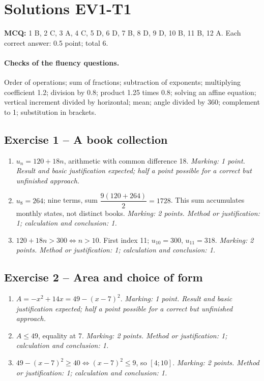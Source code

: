 \clearpage\section*{Solutions EV1-T1}\label{EV1-T1-CORR}
\textbf{MCQ:} 1 B, 2 C, 3 A, 4 C, 5 D, 6 D, 7 B, 8 D, 9 D, 10 B, 11 B, 12 A. Each correct answer: 0.5 point; total 6.
\paragraph{Checks of the fluency questions.} Order of operations; sum of fractions; subtraction of exponents; multiplying coefficient 1.2; division by 0.8; product 1.25 times 0.8; solving an affine equation; vertical increment divided by horizontal; mean; angle divided by 360; complement to 1; substitution in brackets.
\subsection*{Exercise 1 -- A book collection}
\begin{enumerate}
\item $u_n=120+18n$, arithmetic with common difference 18. \textit{Marking: 1 point. Result and basic justification expected; half a point possible for a correct but unfinished approach.}
\item $u_8=264$; nine terms, sum $\dfrac{9(120+264)}{2}=1728$. This sum accumulates monthly states, not distinct books. \textit{Marking: 2 points. Method or justification: 1; calculation and conclusion: 1.}
\item $120+18n>300\iff n>10$. First index 11; $u_{10}=300$, $u_{11}=318$. \textit{Marking: 2 points. Method or justification: 1; calculation and conclusion: 1.}
\end{enumerate}
\subsection*{Exercise 2 -- Area and choice of form}
\begin{enumerate}
\item $A=-x^2+14x=49-(x-7)^2$. \textit{Marking: 1 point. Result and basic justification expected; half a point possible for a correct but unfinished approach.}
\item $A\leq49$, equality at 7. \textit{Marking: 2 points. Method or justification: 1; calculation and conclusion: 1.}
\item $49-(x-7)^2\geq40\iff(x-7)^2\leq9$, so $[4;10]$. \textit{Marking: 2 points. Method or justification: 1; calculation and conclusion: 1.}
\end{enumerate}
